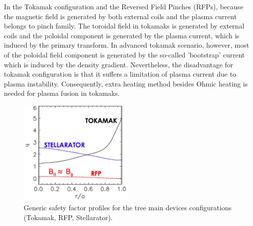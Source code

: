 % 
In the Tokamak configuration and the Reversed Field Pinches (RFPs), because the magnetic field is generated by both external coils and the plasma current  belongs to pinch family. 
%
The toroidal field in tokamaks is generated by external coils and the poloidal component is generated by the plasma current, which is induced by the primary transform. In advanced tokamak scenario, however, most of the poloidal field component is generated by the so-called ’bootstrap’ current which is induced by the density gradient. Nevertheless, the disadvantage for tokamak configuration is that it suffers a limitation of plasma current due to plasma instability. Consequently, extra heating method besides Ohmic heating is needed for plasma fusion in tokamaks. 
%
\begin{figure}[ht!]
\includegraphics[width=0.5\textwidth]{img/safety-fact.jpg} \centering
\caption{Generic safety factor profiles for the tree main devices configurations (Tokamak, RFP, Stellarator).}
\label{rfx}
\end{figure}
%

